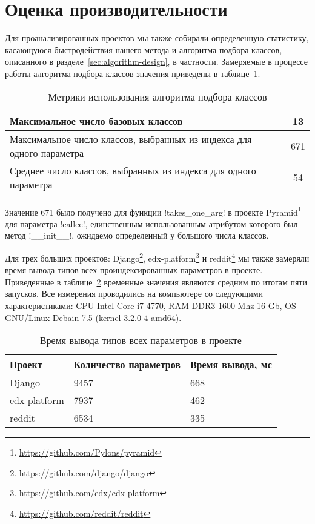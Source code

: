 
\section{Оценка производительности}
\label{sec:performance-evaluation}

Для проанализированных проектов мы также собирали определенную статистику,
касающуюся быстродействия нашего метода и алгоритма подбора классов, описанного
в разделе~\ref{sec:algorithm-design}, в частности. Замеряемые в процессе работы
алгоритма подбора классов значения приведены в таблице~\ref{tab:performance-metrics}.

\begin{table}[H]
  \small
  \centering
  \caption{Метрики использования алгоритма подбора классов}
  \label{tab:performance-metrics}
    \begin{tabularx}{\textwidth}{|X|c|}
      \hline
      Максимальное число базовых классов & 13
      \\ \hline
      Максимальное число классов, выбранных из индекса для одного параметра & 671
      \\ \hline
      Среднее число классов, выбранных из индекса для одного параметра & 54
      \\ \hline
    \end{tabularx}
\end{table}

Значение 671 было получено для функции !takes_one_arg! в проекте
Pyramid\footnote{\url{https://github.com/Pylons/pyramid}} для
параметра !callee!, единственным использованным атрибутом которого был
метод !__init__!, ожидаемо определенный у большого числа классов.

Для трех больших проектов: Django\footnote{\url{https://github.com/django/django}},
edx-platform\footnote{\url{https://github.com/edx/edx-platform}} и
reddit\footnote{\url{https://github.com/reddit/reddit}} мы также замеряли
время вывода типов всех проиндексированных параметров в проекте. Приведенные в
таблице~\ref{tab:performance-evaluation} временные значения являются средним по
итогам пяти запусков. Все измерения проводились на компьютере со следующими 
характеристиками: CPU Intel Core i7-4770, RAM DDR3 1600 Mhz 16 Gb, OS GNU/Linux
Debain 7.5 (kernel 3.2.0-4-amd64).

\begin{table}[H]
  \small
  \centering
  \caption{Время вывода типов всех параметров в проекте}
  \label{tab:performance-evaluation}
    \begin{tabularx}{\textwidth}{|X|X|X|}
      \hline
      Проект & Количество параметров & Время вывода, мс
      \\ \hline
      Django & 9457 & 668 
      \\ \hline
      edx-platform & 7937 & 462
      \\ \hline
      reddit & 6534 & 335
      \\ \hline
    \end{tabularx}
\end{table}




